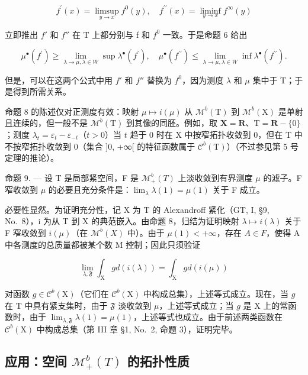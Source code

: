 \[
f ^ {\prime} (x) = \limsup _ {y \to x} f ^ {0} (y), \quad f ^ {\prime \prime} (x) = \liminf _ {y \to x} f ^ {\infty} (y)
\]

立即推出 \(f'\) 和 \(f''\) 在 T 上都分别与 f 和 \(f^{0}\) 一致。于是命题 6 给出

\[
\mu^ {\bullet} (f ^ {\prime}) \geqslant \lim _ {\lambda \to \mu ,   \lambda \in W} \sup \lambda^ {\bullet} (f ^ {\prime})  , \quad \mu^ {\bullet} (f ^ {\prime \prime}) \leqslant \lim _ {\lambda \to \mu ,   \lambda \in W} \inf \lambda^ {\bullet} (f ^ {\prime \prime})  .
\]

但是，可以在这两个公式中用 \(f'\) 和 \(f''\) 替换为 \(f^{0}\)，因为测度 \(\lambda\) 和 \(\mu\) 集中于 T；于是得到所需关系。

命题 8 的陈述仅对正测度有效：映射 \(\mu \mapsto i(\mu)\) 从 \(\mathcal{M}^b (\mathrm{T})\) 到 \(\mathcal{M}^b (\mathrm{X})\) 是单射且连续的，但一般不是 \(\mathcal{M}^b (\mathrm{T})\) 到其像的同胚。例如，取 \(\mathbf{X} = \mathbf{R}\)、\(\mathrm{T} = \mathbf{R} - \{0\}\)；测度 \(\lambda_t = \varepsilon_t - \varepsilon_{-t}\)（\(t > 0\)）当 \(t\) 趋于 0 时在 X 中按窄拓扑收敛到 0，但在 T 中不按窄拓扑收敛到 0（集合 {]}0, +∞{[} 的特征函数属于 \(\mathcal{C}^b (\mathrm{T})\)）（不过参见第 5 号定理的推论）。

命题 9. --- 设 T 是局部紧空间，F 是 \(\mathcal{M}_{+}^{b}(T)\) 上淡收敛到有界测度 \(\mu\) 的滤子。F 窄收敛到 \(\mu\) 的必要且充分条件是：\(\lim_{\lambda}\lambda(1)=\mu(1)\) 关于 F 成立。

必要性显然。为证明充分性，记 X 为 T 的 Alexandroff 紧化（GT, I, §9, No.~8），i 为从 T 到 X 的典范嵌入。由命题 8，归结为证明映射 \(\lambda \mapsto i(\lambda)\) 关于 F 窄收敛到 \(i(\mu)\)（在 \(\mathcal{M}^{b}(X)\) 中）。由于 \(\mu(1) < +\infty\)，存在 \(A \in F\)，使得 A 中各测度的总质量都被某个数 M 控制；因此只须验证

\[
\lim _ {\lambda , \mathfrak {F}} \int_ {\mathrm{X}} g d (i (\lambda)) = \int_ {\mathrm{X}} g d (i (\mu))\tag{5}
\]

对函数 \(g \in \mathcal{C}^b(\mathrm{X})\)（它们在 \(\mathcal{C}^b(\mathrm{X})\) 中构成总集），上述等式成立。现在，当 \(g\) 在 \(\mathrm{T}\) 中具有紧支集时，由于 \(\mathfrak{F}\) 淡收敛到 \(\mu\)，上述等式成立；当 \(g\) 是 \(\mathrm{X}\) 上的常函数时，由于 \(\lim_{\lambda, \mathfrak{F}} \lambda(1) = \mu(1)\)，上述等式也成立。由于前述两类函数在 \(\mathcal{C}^b(\mathrm{X})\) 中构成总集（第 III 章 §1, No.~2, 命题 3），证明完毕。

\subsection{\texorpdfstring{应用：空间 \(\mathcal{M}_{+}^{b}(T)\) 的拓扑性质}{应用：空间 \textbackslash mathcal\{M\}\_\{+\}\^{}\{b\}(T) 的拓扑性质}}

